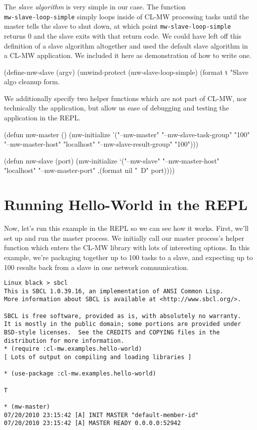 \documentclass[titlepage,12pt]{book}
\newcommand{\xsmall}{\latexhtml{\small}{}}
\newcommand{\xnormalsize}{\latexhtml{\normalsize}{}}
\newcommand{\clmw}{\xsmall\textsc{CL-MW}\xnormalsize\xspace}
\newcommand{\sa}{\textit{slave algorithm}\xspace}
\newcommand{\func}[1]{\mbox{\texttt{#1}}\xspace}
\newcommand{\file}[1]{\texttt{#1}\xspace}
\newcommand{\bold}[1]{\textbf{#1}\xspace}
\begin{document}
The \sa is very simple in our case. The function\\
\func{mw-slave-loop-simple} simply loops inside of \clmw processing
tasks until the master tells the slave to shut down, at which point
\func{mw-slave-loop-simple} returns 0 and the slave exits with
that return code. We could have left off this definition of a slave
algorithm altogether and used the default slave algorithm in a \clmw
application. We included it here as demonstration of how to write one.

\begin{lisp}[caption=\file{hello-world.lisp: \bold{Part 3 of 4}}]
(define-mw-slave (argv)
  (unwind-protect
       (mw-slave-loop-simple)
    (format t "Slave algo cleanup form.~%
\end{lisp}

We additionally specify two helper functions which are not part of
\clmw, nor technically the application, but allow us ease of debugging
and testing the application in the REPL.

\begin{lisp}[caption=\file{hello-world.lisp: \bold{Part 4 of 4}}]
(defun mw-master ()
  (mw-initialize 
    '("--mw-master" "--mw-slave-task-group" "100"
                    "--mw-master-host" "localhost"
                    "--mw-slave-result-group" "100")))

(defun mw-slave (port)
  (mw-initialize 
    `("--mw-slave" "--mw-master-host" "localhost"
                   "--mw-master-port"
                   ,(format nil "~D" port))))
\end{lisp}

\section{Running Hello-World in the REPL}

Now, let's run this example in the REPL so we can see how it
works. First, we'll set up and run the master process. We initially
call our master process's helper function which enters the \clmw
library with lots of interesting options. In this example, we're
packaging together up to 100 tasks to a slave, and expecting up to
100 results back from a slave in one network communication.

\small
\begin{verbatim}
Linux black > sbcl
This is SBCL 1.0.39.16, an implementation of ANSI Common Lisp.
More information about SBCL is available at <http://www.sbcl.org/>.

SBCL is free software, provided as is, with absolutely no warranty.
It is mostly in the public domain; some portions are provided under
BSD-style licenses.  See the CREDITS and COPYING files in the
distribution for more information.
* (require :cl-mw.examples.hello-world)
[ Lots of output on compiling and loading libraries ]

* (use-package :cl-mw.examples.hello-world)

T

* (mw-master)
07/20/2010 23:15:42 [A] INIT MASTER "default-member-id"
07/20/2010 23:15:42 [A] MASTER READY 0.0.0.0:52942
\end{verbatim}
\normalsize
\end{document}
